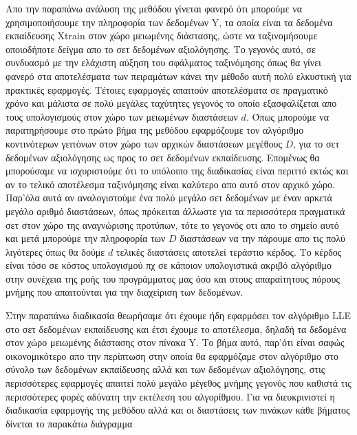 \par
Απο την παραπάνω ανάλυση της μεθόδου γίνεται φανερό ότι μπορούμε να χρησιμοποιήσουμε την πληροφορία των δεδομένων \textlatin{Y}, τα οποία είναι τα δεδομένα εκπαίδευσης \textlatin{Xtrain} στον χώρο μειωμένης διάστασης, ώστε να ταξινομήσουμε οποιοδήποτε δείγμα απο το σετ δεδομένων αξιολόγησης. Το γεγονός αυτό, σε συνδυασμό με την ελάχιστη αύξηση του σφάλματος ταξινόμησης όπως θα γίνει φανερό στα αποτελέσματα των πειραμάτων κάνει την μέθοδο αυτή πολύ ελκυστική για πρακτικές εφαρμογές. Τέτοιες εφαρμογές απαιτούν αποτελέσματα σε πραγματικό χρόνο και μάλιστα σε πολύ μεγάλες ταχύτητες γεγονός το οποίο εξασφαλίζεται απο τους υπολογισμούς στον χώρο των μειωμένων διαστάσεων $d$. Όπως μπορούμε να παρατηρήσουμε στο πρώτο βήμα της μεθόδου εφαρμόζουμε τον αλγόριθμο κοντινότερων γειτόνων στον χώρο των αρχικών διαστάσεων μεγέθους $D$, για το σετ δεδομένων αξιολόγησης ως προς το σετ δεδομένων εκπαίδευσης. Επομένως θα μπορούσαμε να ισχυριστούμε ότι το υπόλοιπο της διαδικασίας είναι περιττό εκτώς και αν το τελικό αποτέλεσμα ταξινόμησης είναι καλύτερο απο αυτό στον αρχικό χώρο. Παρ'όλα αυτά αν αναλογιστούμε ένα πολύ μεγάλο σετ δεδομένων με έναν αρκετά μεγάλο αριθμό διαστάσεων, όπως πρόκειται άλλωστε για τα περισσότερα πραγματικά σετ στον χώρο της αναγνώρισης προτύπων, τότε το γεγονός οτι απο το σημείο αυτό και μετά μπορούμε την πληροφορία των $D$ διαστάσεων να την πάρουμε απο τις πολύ λιγότερες όπως θα δούμε $d$ τελικές διαστάσεις αποτελεί τεράστιο κέρδος. Το κέρδος είναι τόσο σε κόστος υπολογισμού πχ σε κάποιον υπολογιστικά ακριβό αλγόριθμο στην συνέχεια της ροής του προγράμματος μας όσο και στους απαραίτητους πόρους μνήμης που απαιτούνται για την διαχείριση των δεδομένων.  
\par
Στην παραπάνω διαδικασία θεωρήσαμε ότι έχουμε ήδη εφαρμόσει τον αλγόριθμο \textlatin{LLE} στο σετ δεδομένων εκπαίδευσης και έτσι έχουμε το αποτέλεσμα, δηλαδή τα δεδομένα στον χώρο μειωμένης διάστασης στον πίνακα \textlatin{Y}. Το βήμα αυτό, παρ'ότι είναι σαφώς οικονομικότερο απο την περίπτωση στην οποία θα εφαρμόζαμε στον αλγόριθμο στο σύνολο των δεδομένων εκπαίδευσης αλλά και των δεδομένων αξιολόγησης, στις περισσότερες εφαρμογές απαιτεί πολύ μεγάλο μέγεθος μνήμης γεγονός που καθιστά τις περισσότερες φορές αδύνατη την εκτέλεση του αλγορίθμου. Για να διευκρινιστεί η διαδικασία εφαρμογής της μεθόδου αλλά και οι διαστάσεις των πινάκων κάθε βήματος δίνεται το παρακάτω διάγραμμα  
\newpage
